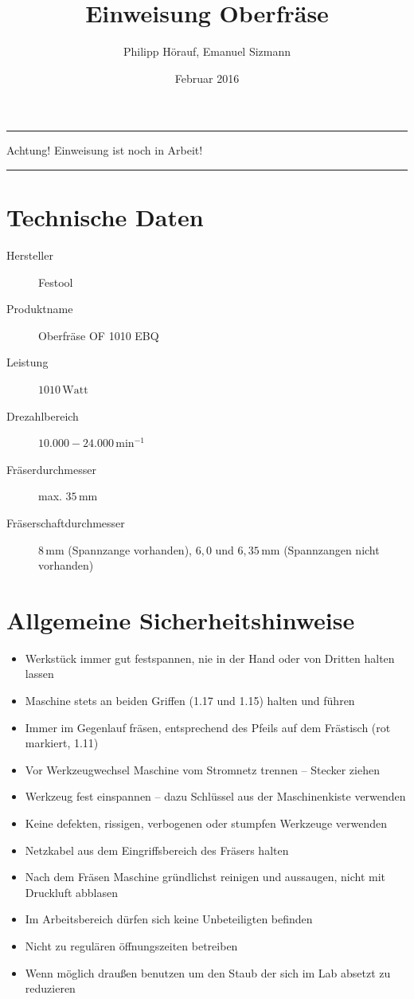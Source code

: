\documentclass{\basedir/fablab-document}
\date{Februar 2016}
\author{Philipp Hörauf, Emanuel Sizmann}
\title{Einweisung Oberfräse}
\begin{document}
\dosecttoc
\faketableofcontents
{}

\color{red}
\hrule
\begin{center}
\large{Achtung! Einweisung ist noch in Arbeit!}
\vspace{0.1cm}
\end{center}
\hrule
\color{black}

\section{Technische Daten}
\begin{description}
    \item[Hersteller] Festool
    \item[Produktname] Oberfräse OF 1010 EBQ
    \item[Leistung] $1010\,\mathrm{Watt}$
    \item[Drezahlbereich] $10.000 - 24.000\,\mathrm{min}^{-1}$
    \item[Fräserdurchmesser] max. $35\,\mathrm{mm}$
    \item[Fräserschaftdurchmesser] $8\,\mathrm{mm}$ (Spannzange vorhanden), $6,0$ und $6,35\,\mathrm{mm}$ (Spannzangen nicht vorhanden)
    
\end{description}


\section[Allgemeine Sicherheitshinweise]{Allgemeine Sicherheitshinweise}
\begin{itemize}
\item Werkstück immer gut festspannen, nie in der Hand oder von Dritten halten lassen
\item Maschine stets an beiden Griffen (1.17 und 1.15) halten und führen
\item Immer im Gegenlauf fräsen, entsprechend des Pfeils auf dem Frästisch (rot markiert, 1.11)
\item Vor Werkzeugwechsel Maschine vom Stromnetz trennen -- Stecker ziehen
\item Werkzeug fest einspannen -- dazu Schlüssel aus der Maschinenkiste verwenden
\item Keine defekten, rissigen, verbogenen oder stumpfen Werkzeuge verwenden
\item Netzkabel aus dem Eingriffsbereich des Fräsers halten
\item Nach dem Fräsen Maschine gründlichst reinigen und aussaugen, nicht mit Druckluft abblasen
\item Im Arbeitsbereich dürfen sich keine Unbeteiligten befinden
\item Nicht zu regulären öffnungszeiten betreiben 
\item Wenn möglich draußen benutzen um den Staub der sich im Lab absetzt zu reduzieren
\end{itemize}
\end{document}
